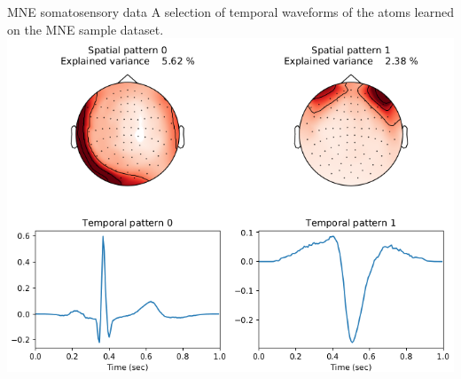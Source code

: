\documentclass{beamer}
\begin{document}
\begin{frame}{MNE somatosensory data}
A selection of temporal waveforms of the atoms learned on the MNE sample dataset.\\
\centering
\includegraphics[height=0.8\textheight]{artifacts}
\end{frame}
\end{document}
